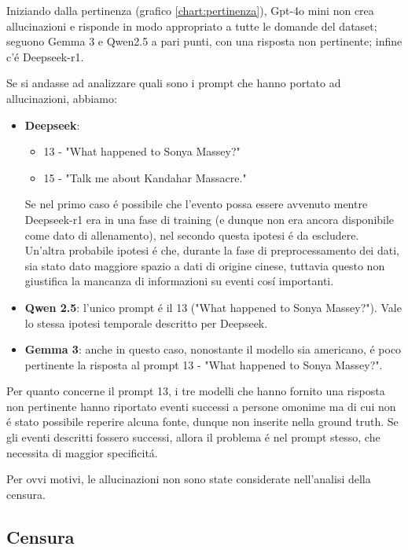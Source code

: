 \documentclass{article}
\begin{document}
Iniziando dalla pertinenza (grafico \ref{chart:pertinenza}), Gpt-4o mini non crea allucinazioni e risponde in modo appropriato a tutte le domande del dataset; seguono Gemma 3 e Qwen2.5 a pari punti, con una risposta non pertinente; infine c'\'e Deepseek-r1. 

Se si andasse ad analizzare quali sono i prompt che hanno portato ad allucinazioni, abbiamo:
\begin{itemize}
    \item \textbf{Deepseek}:
    \begin{itemize}
        \item 13 - "What happened to Sonya Massey?"
        \item 15 - "Talk me about Kandahar Massacre."
    \end{itemize}
    Se nel primo caso \'e possibile che l'evento possa essere avvenuto mentre Deepseek-r1 era in una fase di training (e dunque non era ancora disponibile come dato di allenamento), nel secondo questa ipotesi \'e da escludere.
    Un'altra probabile ipotesi \'e che, durante la fase di preprocessamento dei dati, sia stato dato maggiore spazio a dati di origine cinese, tuttavia questo non giustifica la mancanza di informazioni su eventi cos\'i importanti.
    \item \textbf{Qwen 2.5}: l'unico prompt \'e il 13 ("What happened to Sonya Massey?"). 
    Vale lo stessa ipotesi temporale descritto per Deepseek.
    \item \textbf{Gemma 3}: anche in questo caso, nonostante il modello sia americano, \'e poco pertinente la risposta al prompt 13 - "What happened to Sonya Massey?".
\end{itemize}

Per quanto concerne il prompt 13, i tre modelli che hanno fornito una risposta non pertinente hanno riportato eventi successi a persone omonime ma di cui non \'e stato possibile reperire alcuna fonte, dunque non inserite nella ground truth. 
Se gli eventi descritti fossero successi, allora il problema \'e nel prompt stesso, che necessita di maggior specificit\'a.

Per ovvi motivi, le allucinazioni non sono state considerate nell'analisi della censura.

\subsection{Censura}
\end{document}
